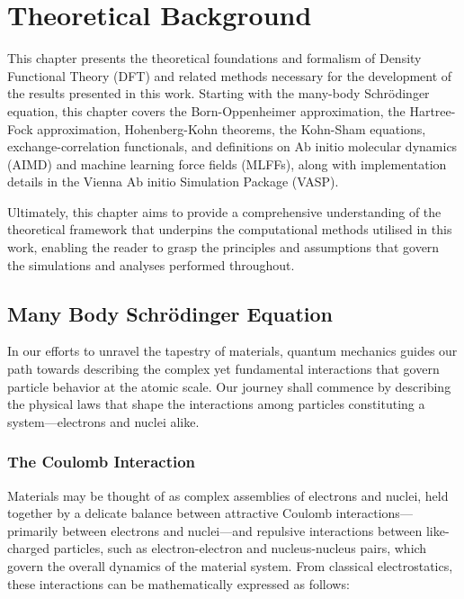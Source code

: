 
\chapter{Theoretical Background} %

\label{Chapter2} %

This chapter presents the theoretical foundations and formalism of Density Functional Theory (DFT) and related methods necessary for the development of the results presented in this work. Starting with the many-body Schrödinger equation, this chapter covers the Born-Oppenheimer approximation, the Hartree-Fock approximation, Hohenberg-Kohn theorems, the Kohn-Sham equations, exchange-correlation functionals, and definitions on Ab initio molecular dynamics (AIMD) and machine learning force fields (MLFFs), along with implementation details in the Vienna Ab initio Simulation Package (VASP).

Ultimately, this chapter aims to provide a comprehensive understanding of the theoretical framework that underpins the computational methods utilised in this work, enabling the reader to grasp the principles and assumptions that govern the simulations and analyses performed throughout.

\section{Many Body Schrödinger Equation}
In our efforts to unravel the tapestry of materials, quantum mechanics guides our path towards describing the complex yet fundamental interactions that govern particle behavior at the atomic scale. Our journey shall commence by describing the physical laws that shape the interactions among particles constituting a system---electrons and nuclei alike. 

\subsection{The Coulomb Interaction}

Materials may be thought of as complex assemblies of electrons and nuclei, held together by a delicate balance between attractive Coulomb interactions---primarily between electrons and nuclei---and repulsive interactions between like-charged particles, such as electron-electron and nucleus-nucleus pairs, which govern the overall dynamics of the material system\supercite{giustino2014materials, sholl2023density, kaxiras2003atomic}. From classical electrostatics, these interactions can be mathematically expressed as follows: 

